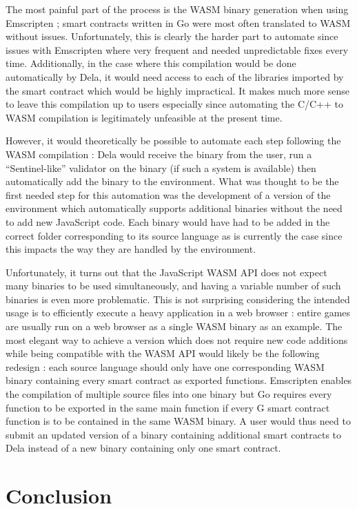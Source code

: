 \documentclass[11pt, a4paper, twoside, openright]{article}
\begin{document}
The most painful part of the process is the WASM binary generation when using Emscripten ; smart contracts written in Go were most often translated to WASM without issues. Unfortunately, this is clearly the harder part to automate since issues with Emscripten where very frequent and needed unpredictable fixes every time. Additionally, in the case where this compilation would be done automatically by Dela, it would need access to each of the libraries imported by the smart contract which would be highly impractical. It makes much more sense to leave this compilation up to users especially since automating the C/C++ to WASM compilation is legitimately unfeasible at the present time.

However, it would theoretically be possible to automate each step following the WASM compilation : Dela would receive the binary from the user, run a ``Sentinel-like'' validator on the binary (if such a system is available) then automatically add the binary to the environment. What was thought to be the first needed step for this automation was the development of a version of the environment which automatically supports additional binaries without the need to add new JavaScript code. Each binary would have had to be added in the correct folder corresponding to its source language as is currently the case since this impacts the way they are handled by the environment. 

Unfortunately, it turns out that the JavaScript WASM API does not expect many binaries to be used simultaneously, and having a variable number of such binaries is even more problematic. This is not surprising considering the intended usage is to efficiently execute a heavy application in a web browser : entire games are usually run on a web browser as a single WASM binary as an example. The most elegant way to achieve a version which does not require new code additions while being compatible with the WASM API would likely be the following redesign : each source language should only have one corresponding WASM binary containing every smart contract as exported functions. Emscripten enables the compilation of multiple source files into one binary but Go requires every function to be exported in the same main function if every G smart contract function is to be contained in the same WASM binary. A user would thus need to submit an updated version of a binary containing additional smart contracts to Dela instead of a new binary containing only one smart contract.

\section{Conclusion}
\end{document}

